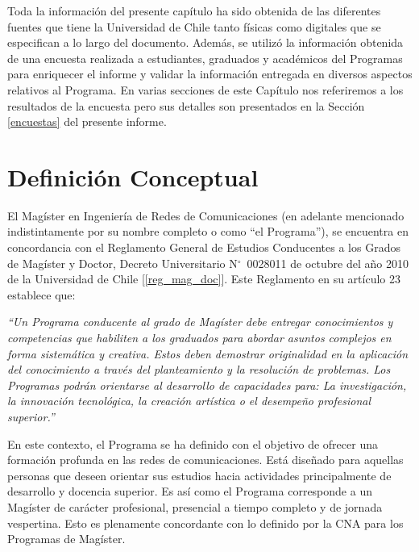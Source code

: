 Toda la información del presente capítulo ha sido obtenida de las diferentes fuentes que tiene la
Universidad de Chile tanto físicas como digitales que se especifican a lo largo del documento.
Además, se utilizó la información obtenida de una encuesta realizada a estudiantes, graduados
y académicos del Programas para enriquecer el informe y validar la información entregada en
diversos aspectos relativos al Programa. En varias secciones de este Capítulo nos referiremos a los
resultados de la encuesta pero sus detalles son presentados en la Sección \ref{encuestas} del presente informe.

\section{Definición Conceptual}

El Magíster en Ingeniería de Redes de Comunicaciones (en adelante mencionado
indistintamente por su nombre completo o como ``el Programa''), se encuentra en concordancia
con el Reglamento General de Estudios Conducentes a los Grados de Magíster y Doctor, Decreto
Universitario N$^\circ$~0028011 de octubre del año 2010 de la Universidad de Chile [\ref{reg_mag_doc}]. Este
Reglamento en su artículo 23 establece que:

\textit{``Un Programa conducente al grado de Magíster debe entregar conocimientos y competencias que
habiliten a los graduados para abordar asuntos complejos en forma sistemática y creativa. Estos
deben demostrar originalidad en la aplicación del conocimiento a través del planteamiento y la
resolución de problemas. Los Programas podrán orientarse al desarrollo de capacidades para:
La investigación, la innovación tecnológica, la creación artística o el desempeño profesional
superior.''}

En este contexto, el Programa se ha definido con el objetivo de ofrecer una formación profunda
en las redes de comunicaciones. Está diseñado para aquellas personas que deseen orientar
sus estudios hacia actividades principalmente de desarrollo y docencia superior. Es así como el
Programa corresponde a un Magíster de carácter profesional, presencial a tiempo completo y de
jornada vespertina. Esto es plenamente concordante con lo definido por la CNA para los Programas
de Magíster. 

